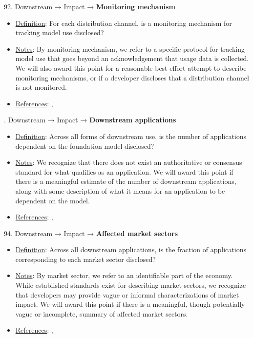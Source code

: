 92. Downstream → Impact → \textbf{Monitoring mechanism}
\vspace{-\parskip}
\begin{itemize}
\item
\underline{Definition}: For each distribution channel, is a monitoring mechanism for tracking model use disclosed?
\item
\underline{Notes}: By monitoring mechanism, we refer to a specific protocol for tracking model use that goes beyond an acknowledgement that usage data is collected. We will also award this point for a reasonable best-effort attempt to describe monitoring mechanisms, or if a developer discloses that a distribution channel is not monitored.
\item
\underline{References}: \citet{springer2018progressive}, \citet{bommasani2023ecosystem}
\end{itemize}


. Downstream → Impact → \textbf{Downstream applications}
\vspace{-\parskip}
\begin{itemize}
\item
\underline{Definition}: Across all forms of downstream use, is the number of applications dependent on the foundation model disclosed?
\item
\underline{Notes}: We recognize that there does not exist an authoritative or consensus standard for what qualifies as an application. We will award this point if there is a meaningful estimate of the number of downstream applications, along with some description of what it means for an application to be dependent on the model.
\item
\underline{References}: \citet{vipra2023concentration}, \citet{bommasani2023ecosystem}
\end{itemize}


94. Downstream → Impact → \textbf{Affected market sectors}
\vspace{-\parskip}
\begin{itemize}
\item
\underline{Definition}: Across all downstream applications, is the fraction of applications corresponding to each market sector disclosed?
\item
\underline{Notes}: By market sector, we refer to an identifiable part of the economy. While established standards exist for describing market sectors, we recognize that developers may provide vague or informal characterizations of market impact. We will award this point if there is a meaningful, though potentially vague or incomplete, summary of affected market sectors.
\item
\underline{References}: \citet{vipra2023concentration}, \citet{bommasani2023ecosystem}
\end{itemize}


